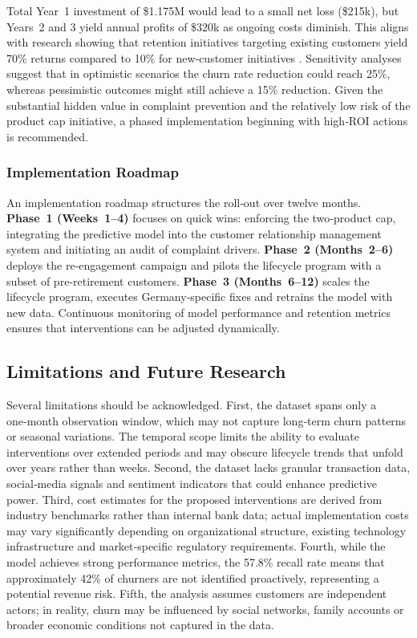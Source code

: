 \documentclass[12pt]{article}
\begin{document}
Total Year~1 investment of \$1.175M would lead to a small net loss (\$215k), but Years~2 and 3 yield annual profits of \$320k as ongoing costs diminish. This aligns with research showing that retention initiatives targeting existing customers yield 70\% returns compared to 10\% for new‑customer initiatives \citep{browning2024retention}. Sensitivity analyses suggest that in optimistic scenarios the churn rate reduction could reach 25\%, whereas pessimistic outcomes might still achieve a 15\% reduction. Given the substantial hidden value in complaint prevention and the relatively low risk of the product cap initiative, a phased implementation beginning with high‑ROI actions is recommended.

\subsubsection{Implementation Roadmap}
An implementation roadmap structures the roll‑out over twelve months.  \textbf{Phase~1 (Weeks~1–4)} focuses on quick wins: enforcing the two‑product cap, integrating the predictive model into the customer relationship management system and initiating an audit of complaint drivers.  \textbf{Phase~2 (Months~2–6)} deploys the re‑engagement campaign and pilots the lifecycle program with a subset of pre‑retirement customers.  \textbf{Phase~3 (Months~6–12)} scales the lifecycle program, executes Germany‑specific fixes and retrains the model with new data.  Continuous monitoring of model performance and retention metrics ensures that interventions can be adjusted dynamically.

\subsection{Limitations and Future Research}
Several limitations should be acknowledged.  First, the dataset spans only a one‑month observation window, which may not capture long‑term churn patterns or seasonal variations.  The temporal scope limits the ability to evaluate interventions over extended periods and may obscure lifecycle trends that unfold over years rather than weeks.  Second, the dataset lacks granular transaction data, social‑media signals and sentiment indicators that could enhance predictive power.  Third, cost estimates for the proposed interventions are derived from industry benchmarks rather than internal bank data; actual implementation costs may vary significantly depending on organizational structure, existing technology infrastructure and market‑specific regulatory requirements.  Fourth, while the model achieves strong performance metrics, the 57.8\% recall rate means that approximately 42\% of churners are not identified proactively, representing a potential revenue risk.  Fifth, the analysis assumes customers are independent actors; in reality, churn may be influenced by social networks, family accounts or broader economic conditions not captured in the data.
\end{document}
